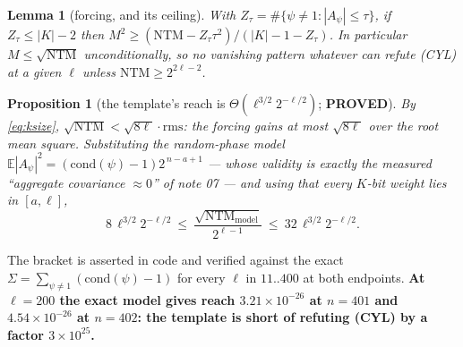 \documentclass[10pt]{article}
\theoremstyle{plain}
\newtheorem{proposition}[theorem]{Proposition}
\newtheorem{lemma}[theorem]{Lemma}
\theoremstyle{definition}
\newcommand{\proved}{\textcolor{proved}{\textsf{\textbf{\footnotesize PROVED}}}}
\begin{document}
\begin{lemma}[forcing, and its ceiling]
With $Z_\tau=\#\{\psi\ne1:|A_\psi|\le\tau\}$, if $Z_\tau\le|K|-2$ then
$M^2\ge(\mathrm{NTM}-Z_\tau\tau^2)/(|K|-1-Z_\tau)$. In particular
$M\le\sqrt{\mathrm{NTM}}$ unconditionally, so \emph{no vanishing pattern
whatever can refute (CYL) at a given $\ell$ unless
$\mathrm{NTM}\ge2^{2\ell-2}$.}
\end{lemma}

\begin{proposition}[the template's reach is $\Theta(\ell^{3/2}2^{-\ell/2})$;
\proved]\label{prop:reach}
By \eqref{eq:ksize}, $\sqrt{\mathrm{NTM}}<\sqrt{8\ell}\cdot\mathrm{rms}$: the
forcing gains at most $\sqrt{8\ell}$ over the root mean square. Substituting
the random-phase model
$\mathbb E|A_\psi|^2=(\mathrm{cond}(\psi)-1)2^{\,n-a+1}$ --- whose validity is
exactly the measured ``aggregate covariance $\approx0$'' of note 07 --- and using
that every $K$-bit weight lies in $[a,\ell]$,
\[
 8\,\ell^{3/2}2^{-\ell/2}\ \le\
 \frac{\sqrt{\mathrm{NTM}_{\mathrm{model}}}}{2^{\ell-1}}\ \le\
 32\,\ell^{3/2}2^{-\ell/2} .
\]
\end{proposition}

The bracket is asserted in code and verified against the exact
$\Sigma=\sum_{\psi\ne1}(\mathrm{cond}(\psi)-1)$ for every $\ell$ in
$11..400$ at both endpoints. \textbf{At $\ell=200$ the exact model gives reach
$3.21\times10^{-26}$ at $n=401$ and $4.54\times10^{-26}$ at $n=402$: the
template is short of refuting (CYL) by a factor $3\times10^{25}$.}
\end{document}
